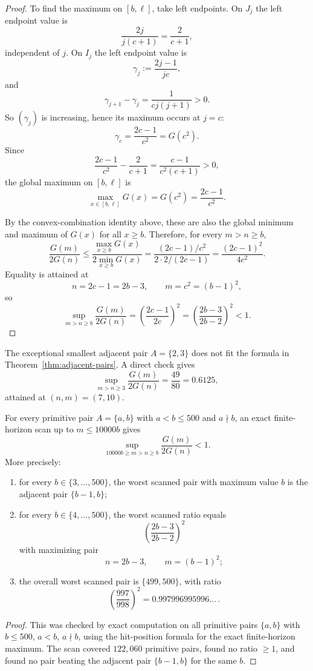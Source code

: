 \begin{proof}
To find the maximum on $[b,\ell]$, take left endpoints. On $J_j$ the left
endpoint value is
\[
\frac{2j}{j(c+1)}=\frac{2}{c+1},
\]
independent of $j$.
On $I_j$ the left endpoint value is
\[
\gamma_j:=\frac{2j-1}{jc},
\]
and
\[
\gamma_{j+1}-\gamma_j=\frac{1}{cj(j+1)}>0.
\]
So $(\gamma_j)$ is increasing, hence its maximum occurs at $j=c$:
\[
\gamma_c=\frac{2c-1}{c^2}=G(c^2).
\]
Since
\[
\frac{2c-1}{c^2}-\frac{2}{c+1}
=\frac{c-1}{c^2(c+1)}>0,
\]
the global maximum on $[b,\ell]$ is
\[
\max_{x\in [b,\ell]} G(x)=G(c^2)=\frac{2c-1}{c^2}.
\]

By the convex-combination identity above, these are also the global minimum and
maximum of $G(x)$ for all $x\ge b$. Therefore, for every $m>n\ge b$,
\[
\frac{G(m)}{2G(n)}
\le
\frac{\max_{x\ge b} G(x)}{2\min_{x\ge b} G(x)}
=
\frac{(2c-1)/c^2}{2\cdot 2/(2c-1)}
=\frac{(2c-1)^2}{4c^2}.
\]
Equality is attained at
\[
n=2c-1=2b-3,\qquad m=c^2=(b-1)^2,
\]
so
\[
\sup_{m>n\ge b}\frac{G(m)}{2G(n)}
=\left(\frac{2c-1}{2c}\right)^2
=\left(\frac{2b-3}{2b-2}\right)^2<1.
\]
\end{proof}

\begin{remark}
The exceptional smallest adjacent pair $A=\{2,3\}$ does not fit the formula in
Theorem~\ref{thm:adjacent-pairs}. A direct check gives
\[
\sup_{m>n\ge 3}\frac{G(m)}{2G(n)}=\frac{49}{80}=0.6125,
\]
attained at $(n,m)=(7,10)$.
\end{remark}

\begin{proposition}\label{prop:pairs500}
For every primitive pair $A=\{a,b\}$ with $a<b\le 500$ and $a\nmid b$, an exact
finite-horizon scan up to $m\le 10000b$ gives
\[
\sup_{10000b\ge m>n\ge b}\frac{G(m)}{2G(n)}<1.
\]
More precisely:
\begin{enumerate}[label=\textup{(\roman*)}]
\item for every $b\in\{3,\dots,500\}$, the worst scanned pair with maximum
value $b$ is the adjacent pair $\{b-1,b\}$;
\item for every $b\in\{4,\dots,500\}$, the worst scanned ratio equals
\[
\left(\frac{2b-3}{2b-2}\right)^2
\]
with maximizing pair
\[
n=2b-3,\qquad m=(b-1)^2;
\]
\item the overall worst scanned pair is $\{499,500\}$, with ratio
\[
\left(\frac{997}{998}\right)^2
=0.997996995996\ldots\,.
\]
\end{enumerate}
\end{proposition}

\begin{proof}
This was checked by exact computation on all primitive pairs $\{a,b\}$ with
$b\le 500$, $a<b$, $a\nmid b$, using the hit-position formula for the exact
finite-horizon maximum. The scan covered $122{,}060$ primitive pairs, found no
ratio $\ge 1$, and found no pair beating the adjacent pair $\{b-1,b\}$ for the
same $b$.
\end{proof}

